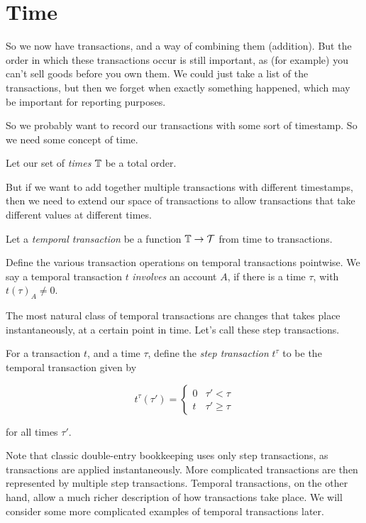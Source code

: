 \section{Time}

So we now have transactions, and a way of combining them (addition).
But the order in which these transactions occur is still important, as (for example) you can't sell goods before you own them.
We could just take a list of the transactions, but then we forget when exactly something happened,
which may be important for reporting purposes.

So we probably want to record our transactions with some sort of timestamp.
So we need some concept of time.

\begin{definition}
    Let our set of \emph{times} $\mathbb{T}$ be a total order.
\end{definition}

But if we want to add together multiple transactions with different timestamps,
then we need to extend our space of transactions to allow transactions that take different values at different times.

\begin{definition}
    Let a \emph{temporal transaction} be a function $\mathbb{T} \to \mathcal{T}$ from time to transactions.

    Define the various transaction operations on temporal transactions pointwise.
    We say a temporal transaction $t$ \emph{involves} an account $A$, if there is a time $\tau$, with $t(\tau)_A \neq 0$.
\end{definition}

The most natural class of temporal transactions are changes that takes place instantaneously, at a certain point in time.
Let's call these step transactions.

\begin{definition}
    For a transaction $t$, and a time $\tau$, define the \emph{step transaction} $t^\tau$ to be the temporal transaction given by

    \begin{equation*}
        t^\tau(\tau') =
        \begin{cases}
            0 & \tau' < \tau \\
            t & \tau' \ge \tau
        \end{cases}
    \end{equation*}

    for all times $\tau'$.
\end{definition}

Note that classic double-entry bookkeeping uses only step transactions, as transactions are applied instantaneously.
More complicated transactions are then represented by multiple step transactions.
Temporal transactions, on the other hand, allow a much richer description of how transactions take place.
We will consider some more complicated examples of temporal transactions later.
